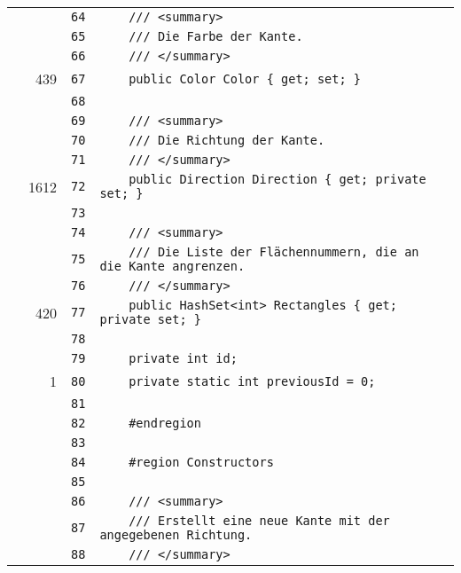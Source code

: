 \documentclass[a4paper,10pt]{article}
\begin{document}
\begin{longtable}[l]{lrrl}
\cellcolor{gray} &  & \verb~64~ & \verb~    /// <summary>~\\
\cellcolor{gray} &  & \verb~65~ & \verb~    /// Die Farbe der Kante.~\\
\cellcolor{gray} &  & \verb~66~ & \verb~    /// </summary>~\\
\cellcolor{green} & 439 & \verb~67~ & \verb~    public Color Color { get; set; }~\\
\cellcolor{gray} &  & \verb~68~ & \verb~~\\
\cellcolor{gray} &  & \verb~69~ & \verb~    /// <summary>~\\
\cellcolor{gray} &  & \verb~70~ & \verb~    /// Die Richtung der Kante.~\\
\cellcolor{gray} &  & \verb~71~ & \verb~    /// </summary>~\\
\cellcolor{green} & 1612 & \verb~72~ & \verb~    public Direction Direction { get; private set; }~\\
\cellcolor{gray} &  & \verb~73~ & \verb~~\\
\cellcolor{gray} &  & \verb~74~ & \verb~    /// <summary>~\\
\cellcolor{gray} &  & \verb~75~ & \verb~    /// Die Liste der Flächennummern, die an die Kante angrenzen.~\\
\cellcolor{gray} &  & \verb~76~ & \verb~    /// </summary>~\\
\cellcolor{green} & 420 & \verb~77~ & \verb~    public HashSet<int> Rectangles { get; private set; }~\\
\cellcolor{gray} &  & \verb~78~ & \verb~~\\
\cellcolor{gray} &  & \verb~79~ & \verb~    private int id;~\\
\cellcolor{green} & 1 & \verb~80~ & \verb~    private static int previousId = 0;~\\
\cellcolor{gray} &  & \verb~81~ & \verb~~\\
\cellcolor{gray} &  & \verb~82~ & \verb~    #endregion~\\
\cellcolor{gray} &  & \verb~83~ & \verb~~\\
\cellcolor{gray} &  & \verb~84~ & \verb~    #region Constructors~\\
\cellcolor{gray} &  & \verb~85~ & \verb~~\\
\cellcolor{gray} &  & \verb~86~ & \verb~    /// <summary>~\\
\cellcolor{gray} &  & \verb~87~ & \verb~    /// Erstellt eine neue Kante mit der angegebenen Richtung.~\\
\cellcolor{gray} &  & \verb~88~ & \verb~    /// </summary>~\\

\end{longtable}
\end{document}
